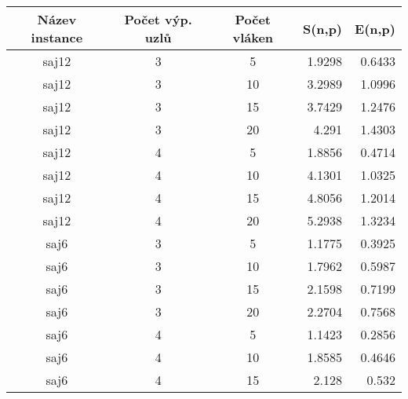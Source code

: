 \documentclass{article} \oddsidemargin=-5mm
\begin{document}
\begin{table}[h]
\centering
\begin{tabular}{|c|c|c|r|r|}
\hline
\rowcolor[HTML]{C0C0C0} 
\textbf{Název instance} & \textbf{Počet výp. uzlů} & \textbf{Počet vláken} & \textbf{S(n,p)} & \textbf{E(n,p)} \\ \hline
saj12                   & 3                        & 5                     & 1.9298          & 0.6433          \\ \hline
saj12                   & 3                        & 10                    & 3.2989          & 1.0996          \\ \hline
saj12                   & 3                        & 15                    & 3.7429          & 1.2476          \\ \hline
saj12                   & 3                        & 20                    & 4.291           & 1.4303          \\ \hline
saj12                   & 4                        & 5                     & 1.8856          & 0.4714          \\ \hline
saj12                   & 4                        & 10                    & 4.1301          & 1.0325          \\ \hline
saj12                   & 4                        & 15                    & 4.8056          & 1.2014          \\ \hline
saj12                   & 4                        & 20                    & 5.2938          & 1.3234          \\ \hline
saj6                    & 3                        & 5                     & 1.1775          & 0.3925          \\ \hline
saj6                    & 3                        & 10                    & 1.7962          & 0.5987          \\ \hline
saj6                    & 3                        & 15                    & 2.1598          & 0.7199          \\ \hline
saj6                    & 3                        & 20                    & 2.2704          & 0.7568          \\ \hline
saj6                    & 4                        & 5                     & 1.1423          & 0.2856          \\ \hline
saj6                    & 4                        & 10                    & 1.8585          & 0.4646          \\ \hline
saj6                    & 4                        & 15                    & 2.128           & 0.532           \\ \hline

\end{tabular}
\end{table}
\end{document}
